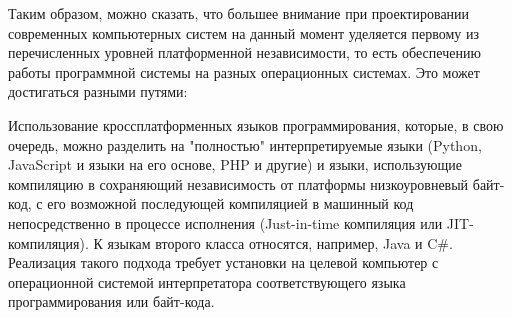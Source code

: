 Таким образом, можно сказать, что большее внимание при проектировании современных компьютерных систем на данный момент уделяется первому из перечисленных уровней платформенной независимости, то есть обеспечению работы программной системы на разных операционных системах. Это может достигаться разными путями:
\begin{textitemize}
	\item Использование кроссплатформенных языков программирования, которые, в свою очередь, можно разделить на "полностью"{} интерпретируемые языки (Python, JavaScript и языки на его основе, PHP и другие) и языки, использующие компиляцию в сохраняющий независимость от платформы низкоуровневый байт-код, с его возможной последующей компиляцией в машинный код непосредственно в процессе исполнения (Just-in-time компиляция или JIT-компиляция). К языкам второго класса относятся, например, Java и C\#. Реализация такого подхода требует установки на целевой компьютер с операционной системой интерпретатора соответствующего языка программирования или байт-кода.
	

\end{textitemize}
